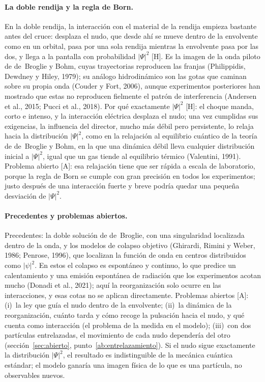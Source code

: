 \documentclass[11pt,a4paper]{article}
\newcommand{\st}[1]{\textup{[#1]}}
\newcommand{\apartado}[1]{\paragraph{#1}}
\begin{document}
\apartado{La doble rendija y la regla de Born.} En la doble rendija, la interacción con el material de la rendija empieza bastante antes del cruce: desplaza el nudo, que desde ahí se mueve dentro de la envolvente como en un orbital, pasa por una sola rendija mientras la envolvente pasa por las dos, y llega a la pantalla con probabilidad $|\Psi|^2$ \st{H}. Es la imagen de la onda piloto de de~Broglie y Bohm, cuyas trayectorias reproducen las franjas (Philippidis, Dewdney y Hiley, 1979); su análogo hidrodinámico son las gotas que caminan sobre su propia onda (Couder y Fort, 2006), aunque experimentos posteriores han mostrado que estas no reproducen fielmente el patrón de interferencia (Andersen et al., 2015; Pucci et al., 2018). Por qué exactamente $|\Psi|^2$ \st{H}: el choque manda, corto e intenso, y la interacción eléctrica desplaza el nudo; una vez cumplidas sus exigencias, la influencia del director, mucho más débil pero persistente, lo relaja hacia la distribución $|\Psi|^2$, como en la relajación al equilibrio cuántico de la teoría de de~Broglie y Bohm, en la que una dinámica débil lleva cualquier distribución inicial a $|\Psi|^2$, igual que un gas tiende al equilibrio térmico (Valentini, 1991). Problema abierto \st{A}: esa relajación tiene que ser rápida a escala de laboratorio, porque la regla de Born se cumple con gran precisión en todos los experimentos; justo después de una interacción fuerte y breve podría quedar una pequeña desviación de $|\Psi|^2$.

\apartado{Precedentes y problemas abiertos.} Precedentes: la doble solución de de~Broglie, con una singularidad localizada dentro de la onda, y los modelos de colapso objetivo (Ghirardi, Rimini y Weber, 1986; Penrose, 1996), que localizan la función de onda en centros distribuidos como $|\psi|^2$. En estos el colapso es espontáneo y continuo, lo que predice un calentamiento y una emisión espontánea de radiación que los experimentos acotan mucho (Donadi et al., 2021); aquí la reorganización solo ocurre en las interacciones, y esas cotas no se aplican directamente. Problemas abiertos \st{A}: (i)~la ley que guía el nudo dentro de la envolvente; (ii)~la dinámica de la reorganización, cuánto tarda y cómo recoge la pulsación hacia el nudo, y qué cuenta como interacción (el problema de la medida en el modelo); (iii)~con dos partículas entrelazadas, el movimiento de cada nudo dependería del otro (sección~\ref{sec:abierto}, punto~\ref{ab:entrelazamiento}). Si el nudo sigue exactamente la distribución $|\Psi|^2$, el resultado es indistinguible de la mecánica cuántica estándar; el modelo ganaría una imagen física de lo que es una partícula, no observables nuevos.
\end{document}

